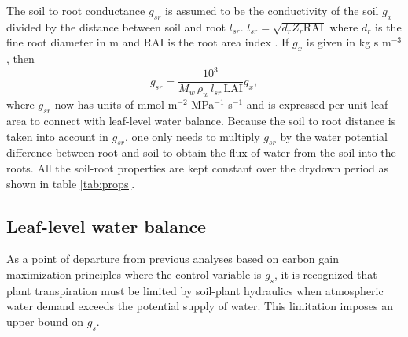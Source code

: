 \documentclass[utf8]{frontiersSCNS} %
\begin{document}
The soil to root conductance $g_{sr}$ is assumed to be the conductivity of the soil $g_x$ divided by the distance between soil and root $l_{sr}$. $l_{sr} = \sqrt{d_r Z_r \text{RAI}}$ where $d_r$ is the fine root diameter in m and RAI is the root area index \citep{manzoni_optimization_2013}. If $g_x$ is given in kg s m$^{-3}$, then
\begin{equation}
    \label{eqn:soil_root}
    g_{sr} = \frac{10^3}{M_w \, \rho_w \, l_{sr} \, \text{LAI}} g_x, 
\end{equation}
where $g_{sr}$ now has units of mmol m$^{-2}$ MPa$^{-1}$ s$^{-1}$ and is expressed per unit leaf area to connect with leaf-level water balance. Because the soil to root distance is taken into account in $g_{sr}$, one only needs to multiply $g_{sr}$ by the water potential difference between root and soil to obtain the flux of water from the soil into the roots. All the soil-root properties are kept constant over the drydown period as shown in table \ref{tab:props}.

\subsection{Leaf-level water balance}

As a point of departure from previous analyses based on carbon gain maximization principles where the control variable is $g_s$, it is recognized that plant transpiration must be limited by soil-plant hydraulics when atmospheric water demand exceeds the potential supply of water. This limitation imposes an upper bound on $g_s$. 
\end{document}
